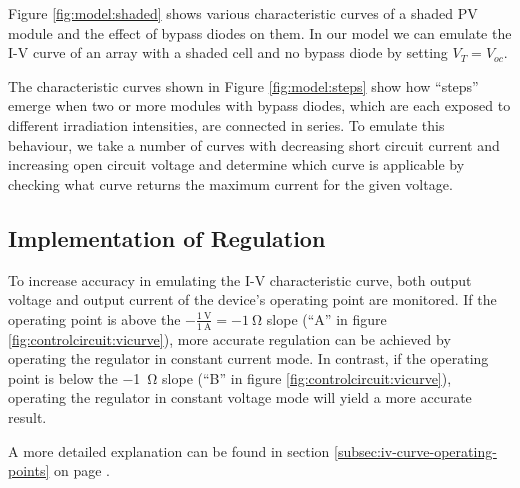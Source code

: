 Figure \ref{fig:model:shaded} shows various  characteristic curves of a shaded
PV  module and  the effect  of bypass  diodes on  them.  In  our model  we can
emulate the I-V  curve of an array with  a shaded cell and no  bypass diode by
setting $V_T = V_{oc}$.


The  characteristic  curves shown  in  Figure  \ref{fig:model:steps} show  how
``steps'' emerge when  two or more modules with bypass  diodes, which are each
exposed  to different  irradiation  intensities, are  connected in  series. To
emulate  this behaviour,  we take  a number  of curves  with decreasing  short
circuit current and increasing open  circuit voltage and determine which curve
is applicable by checking what curve returns the maximum current for the given
voltage.


\subsection{Implementation of Regulation}
\label{subsec:regimplementation}

To increase  accuracy in emulating  the I-V characteristic curve,  both output
voltage and output current of the  device's operating point are monitored.  If
the  operating  point  is  above  the  $-\frac{\SI{1}{\volt}}{\SI{1}{\ampere}}
=  \SI{-1}{\ohm}$ slope  (``A''  in figure  \ref{fig:controlcircuit:vicurve}),
more  accurate  regulation can  be  achieved  by  operating the  regulator  in
constant  current  mode.   In  contrast,  if  the  operating  point  is  below
the  \SI{-1}{\ohm} slope  (``B'' in  figure \ref{fig:controlcircuit:vicurve}),
operating the  regulator in constant voltage  mode will yield a  more accurate
result.

A       more        detailed       explanation       can        be       found
in      section       \ref{subsec:iv-curve-operating-points}      on      page
\pageref{subsec:iv-curve-operating-points}.

